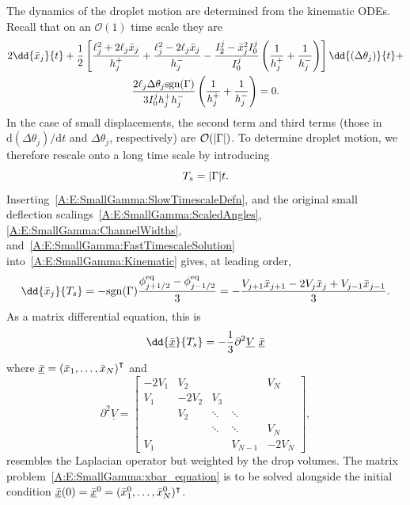 \begin{subappendices}
\begin{figure}[t]
\end{figure}


The dynamics of the droplet motion are determined from the kinematic ODEs. Recall that on an $\mathcal{O}(1)$ time scale they are
\begin{multline}\label{A:E:SmallGamma:Kinematic}
2\dd{\xbarj}{t}  +\frac{1}{2} \left[\frac{\ellj^2 + 2\ellj \xbarj}{h_j^+} + \frac{\ellj^2 - 2\ellj \xbarj}{h_j^-} -  \frac{I_2^j - \xbar_j^2 I_0^j}{I_0^j} \left(\frac{1}{h_j^+} + \frac{1}{h_j^-}\right)\right]\dd{(\dthetaj)}{t} +\\
\frac{2\ellj\dthetaj\sgn(\Gamma)}{3I_0^j h_j^+ h_j^-} \left(\frac{1}{h_j^+} + \frac{1}{h_j^-}\right) = 0.
\end{multline}
In the case of small displacements, the second term and third terms (those in $\mathrm{d}(\Delta \theta_j)/\mathrm{d}t$ and $\Delta \theta_j$, respectively) are $\mathcal{O}(|\Gamma|)$. To determine droplet motion, we therefore rescale onto a long time scale by introducing
\begin{equation}\label{A:E:SmallGamma:SlowTimescaleDefn}
T_{s} = |\Gamma| t.
\end{equation}
Inserting~\eqref{A:E:SmallGamma:SlowTimescaleDefn}, and the original small deflection scalings~\eqref{A:E:SmallGamma:ScaledAngles}, \eqref{A:E:SmallGamma:ChannelWidths}, and~\eqref{A:E:SmallGamma:FastTimescaleSolution} into~\eqref{A:E:SmallGamma:Kinematic} gives, at leading order,
\begin{equation}
\dd{\xbar_j}{T_s} =- \sgn(\Gamma)\frac{\phi_{j+1/2}^\text{eq} - \phi_{j-1/2}^\text{eq}}{3} =- \frac{V_{j+1}\xbar_{j+1} - 2V_j \xbar_{j} + V_{j-1}\xbar_{j-1}}{3}.
\end{equation}
As a matrix differential equation, this is
\begin{equation}\label{A:E:SmallGamma:xbar_equation}
\dd{\underline{\xbar}}{T_s} = -\frac{1}{3}\partial^2\underline{V}~\underline{\xbar}
\end{equation}
where $\underline{\bar{x}} = \left(\bar{x}_1,\dots, \bar{x}_N\right)^{\intercal}$ and
\begin{equation}\label{A:E:SmallGamma:VolumeMatrix}
\partial^2\underline{V} =  \begin{bmatrix}
-2V_1 & V_2   & & & V_N \\
V_1 & -2V_2 & V_3  \\
 & V_2 & \ddots & \ddots \\
& & \ddots & \ddots & V_N \\
V_1& & &V_{N-1}&- 2V_N
\end{bmatrix},
\end{equation}
resembles the Laplacian operator but weighted by the drop volumes. The matrix problem~\eqref{A:E:SmallGamma:xbar_equation} is to be solved alongside the initial condition $\underline{\bar{x}}(0) = \underline{\bar{x}}^0 =  (\bar{x}_1^0,\dots, \bar{x}_N^0)^\intercal$.


\end{subappendices}
